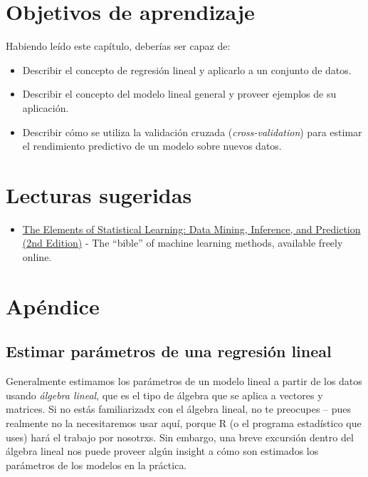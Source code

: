 \documentclass[
  12pt,
]{book}
\providecommand{\tightlist}{%
  \setlength{\itemsep}{0pt}\setlength{\parskip}{0pt}}
\begin{document}
\hypertarget{objetivos-de-aprendizaje}{%
\section{Objetivos de aprendizaje}\label{objetivos-de-aprendizaje}}

Habiendo leído este capítulo, deberías ser capaz de:

\begin{itemize}
\tightlist
\item
  Describir el concepto de regresión lineal y aplicarlo a un conjunto de datos.
\item
  Describir el concepto del modelo lineal general y proveer ejemplos de su aplicación.
\item
  Describir cómo se utiliza la validación cruzada (\emph{cross-validation}) para estimar el rendimiento predictivo de un modelo sobre nuevos datos.
\end{itemize}

\hypertarget{lecturas-sugeridas}{%
\section{Lecturas sugeridas}\label{lecturas-sugeridas}}

\begin{itemize}
\tightlist
\item
  \href{https://web.stanford.edu/~hastie/Papers/ESLII.pdf}{The Elements of Statistical Learning: Data Mining, Inference, and Prediction (2nd Edition)} - The ``bible'' of machine learning methods, available freely online.
\end{itemize}

\hypertarget{apuxe9ndice}{%
\section{Apéndice}\label{apuxe9ndice}}

\hypertarget{estimar-paruxe1metros-de-una-regresiuxf3n-lineal}{%
\subsection{Estimar parámetros de una regresión lineal}\label{estimar-paruxe1metros-de-una-regresiuxf3n-lineal}}

Generalmente estimamos los parámetros de un modelo lineal a partir de los datos usando \emph{álgebra lineal}, que es el tipo de álgebra que se aplica a vectores y matrices. Si no estás familiarizadx con el álgebra lineal, no te preocupes -- pues realmente no la necesitaremos usar aquí, porque R (o el programa estadístico que uses) hará el trabajo por nosotrxs. Sin embargo, una breve excursión dentro del álgebra lineal nos puede proveer algún insight a cómo son estimados los parámetros de los modelos en la práctica.
\end{document}
